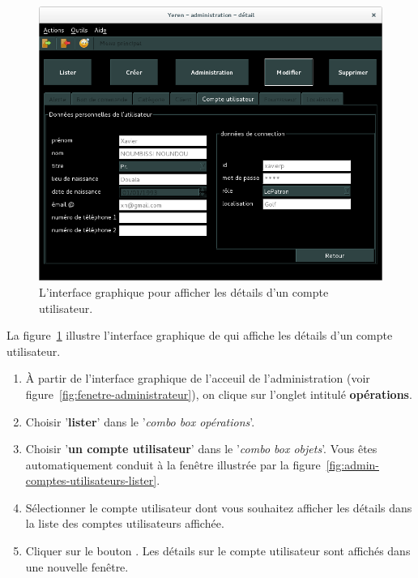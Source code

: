 

\begin{figure}[!htpb]
	\centering
	\includegraphics[scale=0.45]{images/compte-utilisateur-afficher-details.png}
	\caption{L'interface graphique pour afficher les d\'etails
			d'un compte utilisateur.}
	\label{fig:admin-comptes-utilisateurs-afficher-details}
\end{figure}

La figure~\ref{fig:admin-comptes-utilisateurs-afficher-details}
illustre l'interface graphique de \yeren qui affiche les
d\'etails d'un compte utilisateur.

\begin{enumerate}[1)]
	\item \`A partir de l'interface graphique de l'acceuil de
		l'administration (voir figure~\ref{fig:fenetre-administrateur}),
		on clique sur l'onglet intitul\'e \textbf{op\'erations}. 
		
	\item Choisir '\textbf{lister}' dans le '\emph{combo box
		op\'erations}'.
		
	\item Choisir '\textbf{un compte utilisateur}' dans le
		'\emph{combo box objets}'. Vous \^etes automatiquement
		conduit \`a la fen\^etre illustr\'ee par la
		figure~\ref{fig:admin-comptes-utilisateurs-lister}.
		
	\item S\'electionner le compte utilisateur dont vous
		souhaitez afficher les d\'etails dans la liste des
		comptes utilisateurs affich\'ee.
		
	\item Cliquer sur le bouton . Les d\'etails
		sur le compte utilisateur sont affich\'es dans
		une nouvelle fen\^etre.
\end{enumerate}

